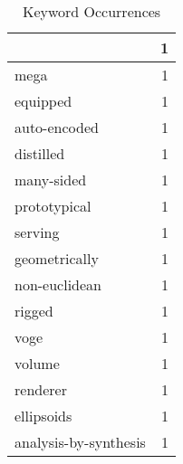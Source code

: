 \begin{table}[h]
\begin{tabular}{|l|r|}
{\hline
(kl & 1 \\
\hline
mega & 1 \\
\hline
equipped & 1 \\
\hline
auto-encoded & 1 \\
\hline
distilled & 1 \\
\hline
many-sided & 1 \\
\hline
prototypical & 1 \\
\hline
serving & 1 \\
\hline
geometrically & 1 \\
\hline
non-euclidean & 1 \\
\hline
rigged & 1 \\
\hline
voge & 1 \\
\hline
volume & 1 \\
\hline
renderer & 1 \\
\hline
ellipsoids & 1 \\
\hline
analysis-by-synthesis & 1 \\
\hline
\end{tabular}
\caption{Keyword Occurrences}
\end{table}
